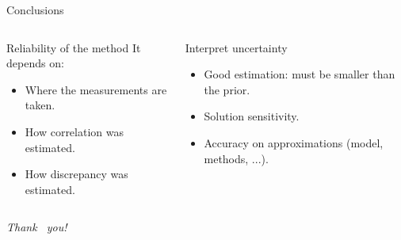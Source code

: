 \documentclass[dvipsnames]{beamer}
\begin{document}
	\begin{frame}{Conclusions}
	\begin{columns}
	\begin{column}{.5\textwidth}
    \begin{block}{Reliability of the method}
    It depends on:
    \begin{itemize}
	\item Where the measurements are taken.
	\item How correlation was estimated.
	\item How discrepancy was estimated.
	\end{itemize}
	\end{block}
	\end{column}
	\begin{column}{.5\textwidth}
	\begin{block}{Interpret uncertainty}
	\begin{itemize}
	\item Good estimation: must be smaller than the prior.
	\item Solution sensitivity.
	\item Accuracy on approximations (model, methods, ...).
	\end{itemize}
	\end{block}
	\end{column}
	\end{columns}
	\end{frame}
	
		
			
			
            

    \begin{frame}
	    \begin{center}
		{\Huge \emph {\textrm{Thank  ~you!}}}
		\end{center}
    \end{frame}
\end{document}

